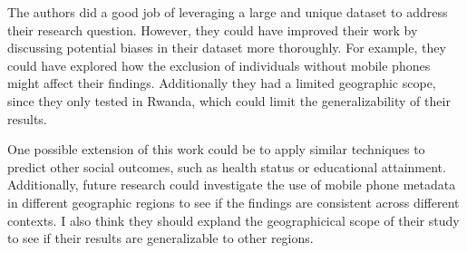 \documentclass[12pt]{article}
\begin{document}
The authors did a good job of leveraging a large and unique dataset to address their research question.  However, they could have improved their work by discussing potential biases in their dataset more thoroughly. For example, they could have explored how the exclusion of individuals without mobile phones might affect their findings. Additionally they had a limited geographic scope, since they only tested in Rwanda, which could limit the generalizability of their results.

One possible extension of this work could be to apply similar techniques to predict other social outcomes, such as health status or educational attainment. Additionally, future research could investigate the use of mobile phone metadata in different geographic regions to see if the findings are consistent across different contexts. I also think they should expland the geographicical scope of their study to see if their results are generalizable to other regions.


\end{document}
